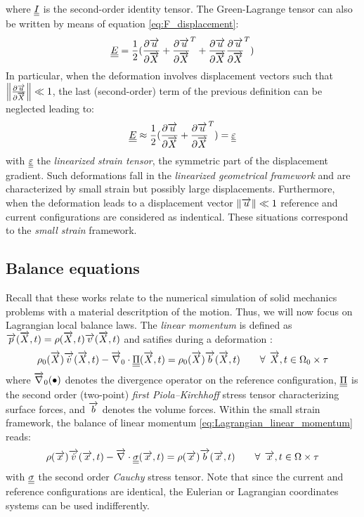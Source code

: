 where ${\underline{\underline{I}}}$ is the second-order identity tensor. The Green-Lagrange tensor can also be written by means of equation \eqref{eq:F_displacement}:
\begin{equation*}
  {\underline{\underline{E}}}=\frac{1}{2}(\frac{\partial {\overrightarrow{u}}}{\partial {\overrightarrow{X}}} + \frac{\partial {\overrightarrow{u}}}{\partial {\overrightarrow{X}}}^T + \frac{\partial {\overrightarrow{u}}}{\partial {\overrightarrow{X}}}\frac{\partial {\overrightarrow{u}}}{\partial {\overrightarrow{X}}}^T)
\end{equation*}
In particular, when the deformation involves displacement vectors such that $\left\Vert\frac{\partial {\overrightarrow{u}}}{\partial {\overrightarrow{X}}}\right\Vert \ll 1$, the last (second-order) term of the previous definition can be neglected leading to:
\begin{equation*}
  {\underline{\underline{E}}} \approx \frac{1}{2}(\frac{\partial {\overrightarrow{u}}}{\partial {\overrightarrow{X}}} + \frac{\partial {\overrightarrow{u}}}{\partial {\overrightarrow{X}}}^T) = {\underline{\underline{\varepsilon}}}
\end{equation*}
with ${\underline{\underline{\varepsilon}}}$ the \textit{linearized strain tensor}, the symmetric part of the displacement gradient. Such deformations fall in the \textit{linearized geometrical framework} and are characterized by small strain but possibly large displacements. Furthermore, when the deformation leads to a displacement vector $\left\Vert{\overrightarrow{u}}\right\Vert \ll 1$ reference and current configurations are considered as indentical. These situations correspond to the \textit{small strain} framework. 

\subsection{Balance equations}
Recall that these works relate to the numerical simulation of solid mechanics problems with a material descritption of the motion. Thus, we will now focus on Lagrangian local balance laws. The \textit{linear momentum} is defined as ${\overrightarrow{p}}({\overrightarrow{X}},t)=\rho({\overrightarrow{X}},t){\overrightarrow{v}}({\overrightarrow{X}},t)$ and satifies during a deformation \cite[Chapter~2]{Truesdell}:
\begin{equation}
  \label{eq:Lagrangian_linear_momentum}
  \rho_0({\overrightarrow{X}}) {\overrightarrow{\dot{v}}}({\overrightarrow{X}},t) - {\overrightarrow{\nabla}}_0 \cdot {\underline{\underline{\Pi}}}({\overrightarrow{X}},t) = \rho_0({\overrightarrow{X}}) {\overrightarrow{b}}({\overrightarrow{X}},t) \qquad \forall \: \: {\overrightarrow{X}},t \in \Omega_0 \times \tau 
\end{equation}
where ${\overrightarrow{\nabla}}_0 (\bullet)$ denotes the divergence operator on the reference configuration, ${\underline{\underline{\Pi}}}$ is the second order (two-point) \textit{first Piola--Kirchhoff} stress tensor characterizing surface forces, and ${\overrightarrow{b}}$ denotes the volume forces. Within the small strain framework, the balance of linear momentum \eqref{eq:Lagrangian_linear_momentum} reads:
\begin{equation}
  \label{eq:HPP_linear_momentum}
  \rho({\overrightarrow{x}}) {\overrightarrow{\dot{v}}}({\overrightarrow{x}},t) - {\overrightarrow{\nabla}} \cdot {\underline{\underline{\sigma}}}({\overrightarrow{x}},t) = \rho({\overrightarrow{x}}) {\overrightarrow{b}}({\overrightarrow{x}},t)  \qquad \forall \: \: {\overrightarrow{x}},t \in \Omega \times \tau 
\end{equation}
with ${\underline{\underline{\sigma}}}$ the second order \textit{Cauchy} stress tensor. Note that since the current and reference configurations are identical, the Eulerian or Lagrangian coordinates systems can be used indifferently.

